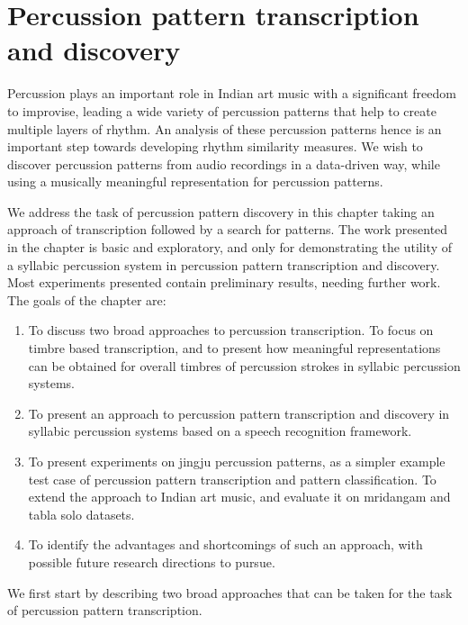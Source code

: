 \chapter{Percussion pattern transcription and discovery}\label{chap:percpatt}
\begin{epigraphs}
\end{epigraphs}
\noindent Percussion plays an important role in Indian art music with a significant freedom to improvise, leading a wide variety of percussion patterns that help to create multiple layers of rhythm. An analysis of these percussion patterns hence is an important step towards developing rhythm similarity measures. We wish to discover percussion patterns from audio recordings in a data-driven way, while using a musically meaningful representation for percussion patterns. 

We address the task of percussion pattern discovery in this chapter taking an approach of transcription followed by a search for patterns. The work presented in the chapter is basic and exploratory, and only for demonstrating the utility of a syllabic percussion system in percussion pattern transcription and discovery. Most experiments presented contain preliminary results, needing further work. The goals of the chapter are: 
\begin{enumerate}[leftmargin=*]
 \item To discuss two broad approaches to percussion transcription. To focus on timbre based transcription, and to present how meaningful representations can be obtained for overall timbres of percussion strokes in syllabic percussion systems.
 \item To present an approach to percussion pattern transcription and discovery in syllabic percussion systems based on a speech recognition framework.
 \item To present experiments on \gls{jingju} percussion patterns, as a simpler example test case of percussion pattern transcription and pattern classification. To extend the approach to Indian art music, and evaluate it on mridangam and tabla solo datasets. 
 \item To identify the advantages and shortcomings of such an approach, with possible future research directions to pursue. 
\end{enumerate}
We first start by describing two broad approaches that can be taken for the task of percussion pattern transcription. 
%
